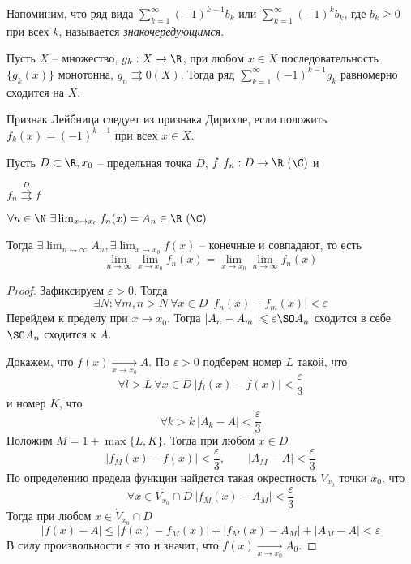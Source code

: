 \begin{Rem}
    Напоминим, что ряд вида $\displaystyle \sum_{k = 1}^{\infty} (-1)^{k - 1}b_k$ или $\displaystyle \sum_{k = 1}^{\infty}(-1)^k b_k$, где $b_k \geqslant 0$ при всех $k$, называется \textit{знакочередующимся}. 
\end{Rem}

\begin{Cons}
    Пусть $X$ -- множество, $g_k : X \to \R$, при любом $x \in X$ последовательность $\{ g_k(x) \}$ монотонна, $g_n \rightrightarrows 0(X).$ Тогда ряд 
    $\displaystyle \sum_{k = 1}^{\infty} (-1)^{k - 1} g_k$ равномерно сходится на $X$.
\end{Cons}

\begin{Rem}
    Признак Лейбница следует из признака Дирихле, если положить $f_k (x) = (-1)^{k - 1}$ при всех $x \in X$.
\end{Rem}


\begin{Thm}
	Пусть $D \subset \R, x_0$ -- предельная точка $D$, $f, f_n : D \to \R \ (\C)$ и
	\begin{MyList}
		\item $f_n \overset{D}{\rightrightarrows} f$
		\item $\forall n \in \N \ \exists \lim_{x \to x_0} f_n(x) = A_n \in \R \ (\C)$
	\end{MyList}  
	Тогда $\exists \lim_{n \to \infty} A_n, \exists \lim_{x \to x_0} f(x)$ -- конечные и совпадают, то есть
	\[\lim_{n \to \infty} \lim_{x \to x_0} f_n(x) = \lim_{x \to x_0} \lim_{n \to \infty}f_n(x)\]
\end{Thm}

\begin{proof}
	Зафиксируем $\varepsilon > 0$. Тогда
	\[\exists N : \forall m, n > N \ \forall x \in D \ |f_n(x) - f_m(x)| < \varepsilon\]
	Перейдем к пределу при $x \to x_0$. Тогда $|A_n - A_m| \leqslant \varepsilon \SO A_n$ сходится в себе $\SO A_n$ сходится к $A$.

	Докажем, что $f(x) \xrightarrow[x \to x_0]{} A$. По $\varepsilon > 0$ подберем номер $L$ такой, что
	\[\forall l > L \ \forall x \in D \ |f_l(x) - f(x)| < \frac{\varepsilon}{3}\]
	и номер $K$, что
	\[\forall k > k \ |A_k - A| < \frac{\varepsilon}{3}\]
	Положим $M = 1 + \max \{L, K\}$. Тогда при любом $x \in D$ 
	\[|f_M(x) - f(x)| < \frac{\varepsilon}{3}, \qquad |A_M - A| < \frac{\varepsilon}{3}\]
	По определению предела функции найдется такая окрестность $V_{x_0}$ точки $x_0$, что 
	\[\forall x \in \dot{V}_{x_0} \cap D \ |f_M(x) - A_M| < \frac{\varepsilon}{3}\]
	Тогда при любом $x \in \dot{V}_{x_0} \cap D$
	\[|f(x) - A| \leqslant |f(x) - f_M(x)| + |f_M(x) - A_M| + |A_M - A| < \varepsilon\]
	В силу произвольности $\varepsilon$ это и значит, что $f(x) \xrightarrow[x \to x_0]{} A_0$.  
\end{proof}

